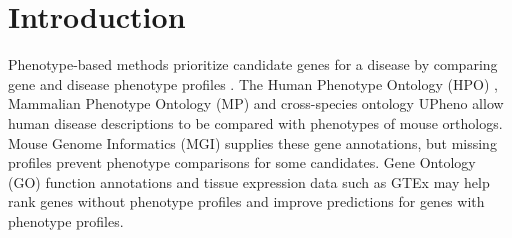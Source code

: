 \documentclass[webpdf,contemporary,large]{oup-authoring-template}%
\theoremstyle{thmstyleone}%
\theoremstyle{thmstyletwo}%
\theoremstyle{thmstylethree}%
\renewcommand{\cite}{\citep}
\begin{document}




\maketitle



\section{Introduction}

Phenotype-based methods prioritize candidate genes for a disease by comparing
gene and disease phenotype profiles
\cite{kohler2009clinical,hoehndorf2011phenomenet,yuan2022evaluation}.
The Human Phenotype Ontology (HPO) \cite{gargano2024human}, Mammalian Phenotype
Ontology (MP) \cite{smith2009mammalian} and cross-species ontology UPheno
\cite{matentzoglu2024unified} allow human disease descriptions to be compared
with phenotypes of mouse orthologs. Mouse Genome Informatics (MGI)
\cite{baldarelli2024mouse} supplies these gene annotations, but missing profiles
prevent phenotype comparisons for some candidates. Gene Ontology (GO) function
annotations \cite{ashburner2000go,gocon2025} and tissue expression data such as
GTEx \cite{gtex2020} may help rank genes without phenotype profiles and improve
predictions for genes with phenotype profiles.
\end{document}
